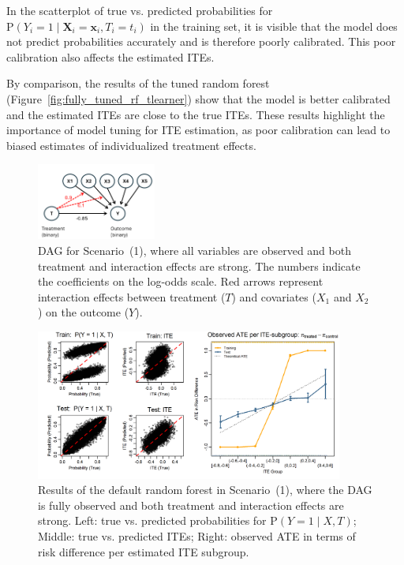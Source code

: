 In the scatterplot of true vs. predicted probabilities for $\text{P}(Y_i = 1 \mid \mathbf{X}_i = \mathbf{x}_i, T_i = t_i)$ in the training set, it is visible that the model does not predict probabilities accurately and is therefore poorly calibrated. This poor calibration also affects the estimated ITEs.

By comparison, the results of the tuned random forest (Figure~\ref{fig:fully_tuned_rf_tlearner}) show that the model is better calibrated and the estimated ITEs are close to the true ITEs. These results highlight the importance of model tuning for ITE estimation, as poor calibration can lead to biased estimates of individualized treatment effects.



\begin{figure}[htbp]
\centering
\includegraphics[width=0.35\textwidth]{img/results_ITE_simulation/simulation_observed.png}
\caption{DAG for Scenario~(1), where all variables are observed and both treatment and interaction effects are strong. The numbers indicate the coefficients on the log-odds scale. Red arrows represent interaction effects between treatment ($T$) and covariates ($X_1$ and $X_2$) on the outcome ($Y$).}
\label{fig:fully_observed_dag_rf_appendix}
\end{figure}


\begin{figure}[htbp]
\centering
\includegraphics[width=0.9\textwidth]{img/results_ITE_simulation/fully_observed_rf_tlearner.png}
\caption{Results of the default random forest in Scenario~(1), where the DAG is fully observed and both treatment and interaction effects are strong. Left: true vs. predicted probabilities for $\text{P}(Y = 1 \mid X, T)$; Middle: true vs. predicted ITEs; Right: observed ATE in terms of risk difference per estimated ITE subgroup.}
\label{fig:fully_observed_glm_rf}
\end{figure}




